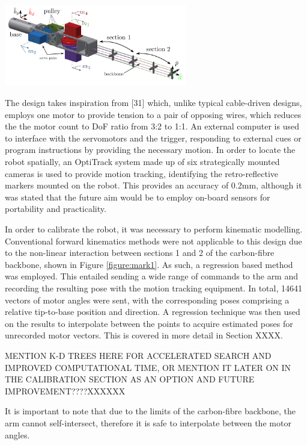 \documentclass[11pt]{article}
\begin{document}
\begin{center}
\includegraphics[width = 0.6\textwidth]{images/mark1.png}
\label{figure:mark1}
\end{center}

The design takes inspiration from [31] which, unlike typical cable-driven designs, employs one motor
to provide tension to a pair of opposing wires, which reduces the the motor count to DoF ratio from 3:2 to 1:1. 
An external computer is used to interface with the servomotors and the trigger, responding to external
cues or program instructions by providing the necessary motion. In order to locate the robot spatially, an OptiTrack system made up of six strategically mounted cameras is
used to provide motion tracking, identifying the retro-reflective markers mounted on the robot. This
provides an accuracy of 0.2mm, although it was stated that the future aim would be to employ
on-board sensors for portability and practicality.


In order to calibrate the robot, it was necessary to perform kinematic modelling. Conventional forward
kinematics methods were not applicable to this design due to the non-linear interaction between sections 1 and 2
of the carbon-fibre backbone, shown in Figure \ref{figure:mark1}. As such, a regression based method was employed.
This entailed sending a wide range of commands to the arm and recording the resulting pose with the
motion tracking equipment. In total, 14641 vectors of motor angles were sent, with the corresponding
poses comprising a relative tip-to-base position and direction. A regression technique
was then used on the results to interpolate between the points to acquire estimated poses for unrecorded
motor vectors. This is covered in more detail in Section XXXX.

MENTION K-D TREES HERE FOR ACCELERATED SEARCH AND IMPROVED COMPUTATIONAL TIME, OR MENTION IT LATER ON IN THE CALIBRATION SECTION AS AN OPTION AND FUTURE IMPROVEMENT????XXXXXX


It is important to note that due to the limits
of the carbon-fibre backbone, the arm cannot self-intersect, therefore it is safe to interpolate
between the motor angles.
\end{document}
